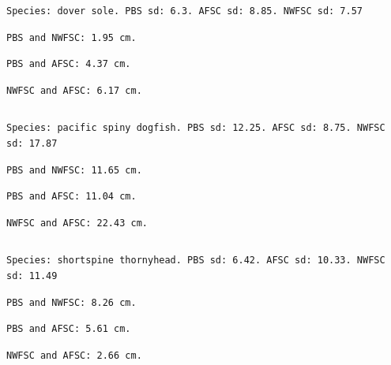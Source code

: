 \documentclass[
  letterpaper,
  DIV=11,
  numbers=noendperiod]{scrartcl}
\begin{document}
\begin{verbatim}
Species: dover sole. PBS sd: 6.3. AFSC sd: 8.85. NWFSC sd: 7.57
\end{verbatim}

\begin{verbatim}
PBS and NWFSC: 1.95 cm.
\end{verbatim}

\begin{verbatim}
PBS and AFSC: 4.37 cm.
\end{verbatim}

\begin{verbatim}
NWFSC and AFSC: 6.17 cm.
\end{verbatim}

\begin{verbatim}
\end{verbatim}

\begin{verbatim}
Species: pacific spiny dogfish. PBS sd: 12.25. AFSC sd: 8.75. NWFSC sd: 17.87
\end{verbatim}

\begin{verbatim}
PBS and NWFSC: 11.65 cm.
\end{verbatim}

\begin{verbatim}
PBS and AFSC: 11.04 cm.
\end{verbatim}

\begin{verbatim}
NWFSC and AFSC: 22.43 cm.
\end{verbatim}

\begin{verbatim}
\end{verbatim}

\begin{verbatim}
Species: shortspine thornyhead. PBS sd: 6.42. AFSC sd: 10.33. NWFSC sd: 11.49
\end{verbatim}

\begin{verbatim}
PBS and NWFSC: 8.26 cm.
\end{verbatim}

\begin{verbatim}
PBS and AFSC: 5.61 cm.
\end{verbatim}

\begin{verbatim}
NWFSC and AFSC: 2.66 cm.
\end{verbatim}

\begin{verbatim}
\end{verbatim}
\end{document}
